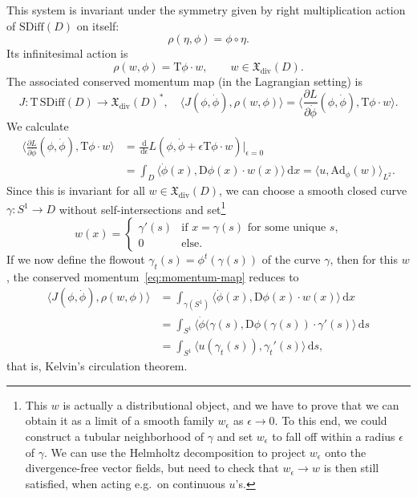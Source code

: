 \documentclass[a4paper,11pt]{article}
\renewcommand{\d}{\ensuremath{\,\textrm{d}}}
\begin{document}
This system is invariant under the symmetry given by right
multiplication action of $\textrm{SDiff}(D)$ on itself:
\begin{equation*}
  \rho(\eta,\phi) = \phi \circ \eta.
\end{equation*}
Its infinitesimal action is
\begin{equation*}
  \rho(w,\phi) = \textrm{T}\phi \cdot w, \qquad w \in \mathfrak{X}_\text{div}(D).
\end{equation*}
The associated conserved momentum map (in the Lagrangian setting) is
\begin{equation}\label{eq:momentum-map}
  J\colon \textrm{T}\,\textrm{SDiff}(D) \to \mathfrak{X}_\text{div}(D)^*, \quad
  \langle J(\phi,\dot{\phi}) , \rho(w,\phi) \rangle
  = \Big\langle \frac{\partial L}{\partial \dot{\phi}}(\phi,\dot{\phi}) , \textrm{T}\phi \cdot w \Big\rangle.
\end{equation}
We calculate
\begin{align*}
  \Big\langle \frac{\partial L}{\partial \dot{\phi}}(\phi,\dot{\phi}) , \textrm{T}\phi \cdot w \Big\rangle
  &= \frac{\d}{\d \epsilon} L(\phi,\dot{\phi} + \epsilon \textrm{T}\phi \cdot w) \Big|_{\epsilon=0}\\
  &= \int_D \langle \dot{\phi}(x) , \textrm{D}\phi(x) \cdot w(x) \rangle \d x
   = \langle u , \textrm{Ad}_\phi(w) \rangle_{L^2}.
\end{align*}
Since this is invariant for all $w \in \mathfrak{X}_\text{div}(D)$, we
can choose a smooth closed curve $\gamma\colon S^1 \to D$ without
self-intersections and set\footnote{%
  This $w$ is actually a distributional object, and we have to prove
  that we can obtain it as a limit of a smooth family $w_\epsilon$ as
  $\epsilon \to 0$. To this end, we could construct a tubular
  neighborhood of $\gamma$ and set $w_\epsilon$ to fall off within a
  radius $\epsilon$ of $\gamma$. We can use the Helmholtz
  decomposition to project $w_\epsilon$ onto the divergence-free
  vector fields, but need to check that $w_\epsilon \to w$ is then
  still satisfied, when acting e.g.\ on continuous $u$'s.}
\begin{equation*}
  w(x) = \begin{cases}
    \gamma'(s) & \text{if $x = \gamma(s)$ for some unique $s$,}\\
    0          & \text{else.}
  \end{cases}
\end{equation*}
If we now define the flowout $\gamma_t(s) = \phi^t(\gamma(s))$ of the
curve $\gamma$, then for this $w$, the conserved
momentum~\eqref{eq:momentum-map} reduces to
\begin{align*}
  \langle J(\phi,\dot{\phi}) , \rho(w,\phi) \rangle
  &= \int_{\gamma(S^1)} \langle \dot{\phi}(x) , \textrm{D}\phi(x)\cdot w(x) \rangle \d x \\
  &= \int_{S^1} \langle \dot{\phi}(\gamma(s) , \textrm{D}\phi(\gamma(s))\cdot \gamma'(s) \rangle \d s \\
  &= \int_{S^1} \langle u(\gamma_t(s)) , \gamma_t'(s) \rangle \d s,
\end{align*}
that is, Kelvin's circulation theorem.
\end{document}
